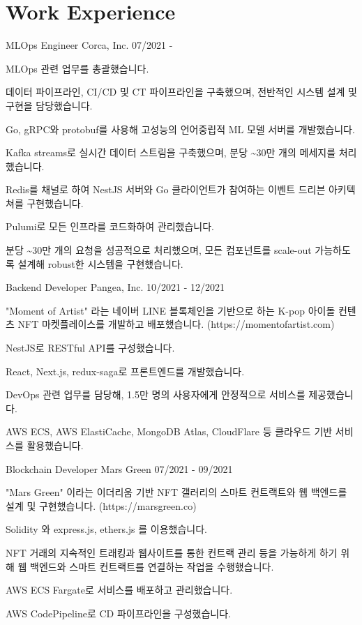 \section{Work Experience}

\cventry
{MLOps Engineer} %
{Corca, Inc.} %
{} %
{07/2021 -} %
\begin{cvitems}
\item {MLOps 관련 업무를 총괄했습니다.}
\item {데이터 파이프라인, CI/CD 및 CT 파이프라인을 구축했으며, 전반적인 시스템 설계 및 구현을 담당했습니다.}
\item {Go, gRPC와 protobuf를 사용해 고성능의 언어중립적 ML 모델 서버를 개발했습니다.}
\item {Kafka streams로 실시간 데이터 스트림을 구축했으며, 분당 \textasciitilde 30만 개의 메세지를 처리했습니다.}
\item {Redis를 채널로 하여 NestJS 서버와 Go 클라이언트가 참여하는 이벤트 드리븐 아키텍쳐를 구현했습니다.}
\item {Pulumi로 모든 인프라를 코드화하여 관리했습니다.}
\item {분당 \textasciitilde 30만 개의 요청을 성공적으로 처리했으며, 모든 컴포넌트를 scale-out 가능하도록 설계해 robust한 시스템을 구현했습니다.}
\end{cvitems}

\cventry
{Backend Developer} %
{Pangea, Inc.} %
{} %
{10/2021 - 12/2021} %
\begin{cvitems}
\item {"Moment of Artist" 라는 네이버 LINE 블록체인을 기반으로 하는 K-pop 아이돌 컨텐츠 NFT 마켓플레이스를 개발하고 배포했습니다. (https://momentofartist.com)}
\item {NestJS로 RESTful API를 구성했습니다.}
\item {React, Next.js, redux-saga로 프론트엔드를 개발했습니다.}
\item {DevOps 관련 업무를 담당해, 1.5만 명의 사용자에게 안정적으로 서비스를 제공했습니다.}
\item {AWS ECS, AWS ElastiCache, MongoDB Atlas, CloudFlare 등 클라우드 기반 서비스를 활용했습니다.}
\end{cvitems}

\cventry
{Blockchain Developer} %
{Mars Green} %
{} %
{07/2021 - 09/2021} %
\begin{cvitems}
\item {"Mars Green" 이라는 이더리움 기반 NFT 갤러리의 스마트 컨트랙트와 웹 백엔드를 설계 및 구현했습니다. (https://marsgreen.co)}
\item {Solidity 와 express.js, ethers.js 를 이용했습니다.}
\item {NFT 거래의 지속적인 트래킹과 웹사이트를 통한 컨트랙 관리 등을 가능하게 하기 위해 웹 백엔드와 스마트 컨트랙트를 연결하는 작업을 수행했습니다.}
\item {AWS ECS Fargate로 서비스를 배포하고 관리했습니다.}
\item {AWS CodePipeline로 CD 파이프라인을 구성했습니다.}
\end{cvitems}

